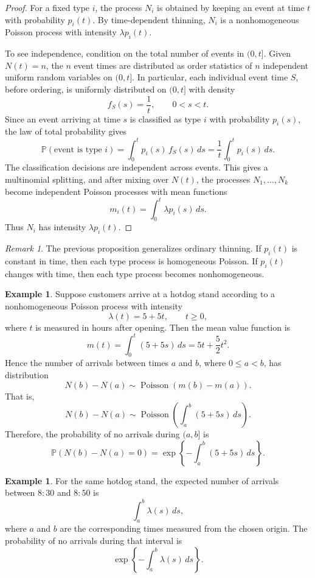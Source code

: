 \documentclass[11pt]{article}
\theoremstyle{plain}
\theoremstyle{definition}
\newtheorem{example}[theorem]{Example}
\theoremstyle{remark}
\newtheorem{remark}[theorem]{Remark}
\begin{document}
\begin{proof}
	For a fixed type \(i\), the process \(N_i\) is obtained by keeping
	an event at time \(t\) with probability \(p_i(t)\). By
	time-dependent thinning, \(N_i\) is a nonhomogeneous Poisson
	process with intensity \(\lambda p_i(t)\).
	
	To see independence, condition on the total number of events in
	\((0,t]\). Given \(N(t)=n\), the \(n\) event times are distributed
	as order statistics of \(n\) independent uniform random variables
	on \((0,t]\). In particular, each individual event time \(S\),
	before ordering, is uniformly distributed on \((0,t]\) with density
	\[
	f_S(s) = \frac{1}{t}, \qquad 0 < s < t.
	\]
	Since an event arriving at time \(s\) is classified as type \(i\)
	with probability \(p_i(s)\), the law of total probability gives
	\[
	\mathbb{P}(\text{event is type }i)
	= \int_0^t p_i(s)\,f_S(s)\,ds
	= \frac{1}{t}\int_0^t p_i(s)\,ds.
	\]
	The classification decisions are independent across events. This
	gives a multinomial splitting, and after mixing over \(N(t)\), the
	processes \(N_1,\dots,N_k\) become independent Poisson processes
	with mean functions
	\[
	m_i(t)=\int_0^t \lambda p_i(s)\,ds.
	\]
	Thus \(N_i\) has intensity \(\lambda p_i(t)\).
\end{proof}

	
	\begin{remark}
		The previous proposition generalizes ordinary thinning. If \(p_i(t)\) is constant in time, then each type process is homogeneous Poisson. If \(p_i(t)\) changes with time, then each type process becomes nonhomogeneous.
	\end{remark}
	
	\begin{example}
		Suppose customers arrive at a hotdog stand according to a nonhomogeneous Poisson process with intensity
		\[
		\lambda(t)=5+5t,
		\qquad t\ge 0,
		\]
		where \(t\) is measured in hours after opening. Then the mean value function is
		\[
		m(t)=\int_0^t (5+5s)\,ds=5t+\frac{5}{2}t^2.
		\]
		Hence the number of arrivals between times \(a\) and \(b\), where \(0\le a<b\), has distribution
		\[
		N(b)-N(a)\sim \operatorname{Poisson}(m(b)-m(a)).
		\]
		That is,
		\[
		N(b)-N(a)\sim \operatorname{Poisson}\left(\int_a^b (5+5s)\,ds\right).
		\]
		Therefore, the probability of no arrivals during \((a,b]\) is
		\[
		\mathbb{P}(N(b)-N(a)=0)
		=
		\exp\left\{-\int_a^b (5+5s)\,ds\right\}.
		\]
	\end{example}
	
	\begin{example}
		For the same hotdog stand, the expected number of arrivals between \(8{:}30\) and \(8{:}50\) is
		\[
		\int_{a}^{b}\lambda(s)\,ds,
		\]
		where \(a\) and \(b\) are the corresponding times measured from the chosen origin. The probability of no arrivals during that interval is
		\[
		\exp\left\{-\int_a^b \lambda(s)\,ds\right\}.
		\]
	\end{example}
	
	
\end{document}
